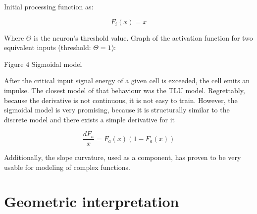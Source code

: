 \documentclass[10pt,oneside]{memoir}
\begin{document}
Initial processing function as:


\begin{equation}
{F}_{i}\left(x\right)=x
\end{equation}


Where $ \Theta $ is the neuron's threshold value.
Graph of the activation function for two equivalent inputs (threshold: $ \Theta =1$):


\begin{figure}
\begin{center}
\end{center}
\label{figure4}
\end{figure}

Figure 4 Sigmoidal model


After the critical input signal energy of a given cell is exceeded, the cell emits an impulse. The closest model of that behaviour was the TLU model. Regrettably, because the derivative is not continuous, it is not easy to train. However, the sigmoidal model is very promising, because it is structurally similar to the discrete model and there exists a simple derivative for it


\begin{equation}
\frac{d{F}_{a}}{x}={F}_{a}\left(x\right)(1-{F}_{a}\left(x\right))
\end{equation}


Additionally, the slope curvature, used as a component, has proven to be very usable for modeling of complex functions.


\section{Geometric interpretation}
\label{geometricinterpretation}
\end{document}
